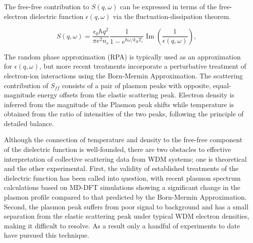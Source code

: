 \documentclass [11pt, proquest, article] {uwthesis}[2016/11/22]
\begin{document}
The free-free contribution to $S(q, \omega)$ can be expressed in terms of the free-electron dielectric function $\epsilon(q, \omega)$  via the fluctuation-dissipation theorem.\cite{kubo1966fluctuation}

\begin{equation}
S(q, \omega) = \frac{\epsilon_0 \hbar q^2}{\pi e^2 n_e} \frac{1}{1 - e^{\hbar \omega/k_B T_e}} \operatorname{Im}(\frac{1}{\epsilon(q, \omega)}),
\end{equation}

The random phase approximation (RPA) is typically used as an approximation for $\epsilon(q, \omega)$, but more recent treatments incorporate a perturbative treatment of electron-ion interactions using the Born-Mermin Approximation. \cite{bohm1953collective, mermin1970lindhard} 
The scattering contribution of $S_{ff}$ consists of a pair of plasmon peaks with opposite, equal-magnitude energy offsets from the elastic scattering peak. Electron density is inferred from the magnitude of the Plasmon peak shifts while temperature is obtained from the ratio of intensities of the two peaks, following the principle of detailed balance. \cite{glenzer2007observations, lee2009x}

Although the connection of temperature and density to the free-free component of the dielectric function is well-founded, there are two obstacles to effective interpretation of collective scattering data from WDM systems; one is theoretical and the other experimental. First, the validity of established treatments of the dielectric function has been called into question, with recent plasmon spectrum calculations based on MD-DFT simulations showing a significant change in the plasmon profile compared to that predicted by the Born-Mermin Approximation. \cite{mattern2014compton, plagemann2012dynamic} Second, the plasmon peak suffers from poor signal to background and has a small separation from the elastic scattering peak under typical WDM electron densities, making it difficult to resolve. As a result only a handful of experiments to date have pursued this technique. 
\end{document}
